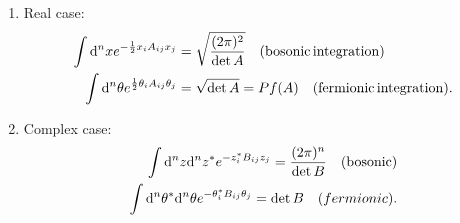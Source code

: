 \begin{enumerate}
\begin{enumerate}
	\item Real case:
	\begin{align}
		\int \mathrm{d}^n x e^{- \frac{1}{2} x_i A_{ij} x_j} &= \sqrt{\frac{(2\pi)^2}{\det A}} \quad (\mathrm{bosonic \, integration}) \\
		\int \mathrm{d}^n \theta e^{\frac{1}{2} \theta_i A_{ij} \theta_j } &= \sqrt{\det A} = Pf(A)  \quad (\mathrm{fermionic \, integration}).
	\end{align}
\item Complex case:
	\begin{align}
		\int \mathrm{d}^n z \mathrm{d}^n z^* e^{-z^*_i B_{ij} z_j} = \frac{(2 \pi)^n}{\det B} \quad (\mathrm{bosonic}) \\
		\int \mathrm{d}^n \theta^* \mathrm{d}^n \theta e^{- \theta^*_i B_{ij} \theta_j} = \det B \quad (fermionic).
	\end{align}
\end{enumerate}
\end{enumerate}




